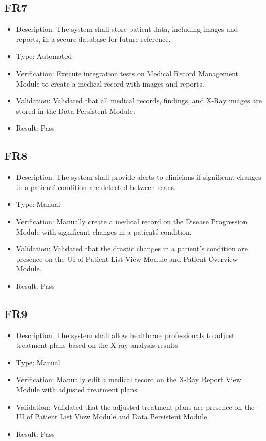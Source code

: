 \documentclass[12pt, titlepage]{article}
\begin{document}
\subsection{FR7}
\begin{itemize}  
  \item Description: The system shall store patient data, including images and reports, in a secure database for future reference.
  \item Type: Automated
  \item Verification: Execute integration tests on Medical Record Management Module to create a medical record with images and reports.
  \item Validation: Validated that all medical records, findings, and X-Ray images are stored in the Data Persistent Module.
  \item Result: Pass
\end{itemize}

\subsection{FR8}
\begin{itemize}  
  \item Description: The system shall provide alerts to clinicians if significant changes in a patient\'s condition are detected between scans.
  \item Type: Manual
  \item Verification: Manually create a medical record on the Disease Progression Module with significant changes in a patient\'s condition.
  \item Validation: Validated that the drastic changes in a patient's condition are presence on the UI of Patient List View Module and Patient Overview Module.
  \item Result: Pass
\end{itemize}

\subsection{FR9}
\begin{itemize}  
  \item Description: The system shall allow healthcare professionals to adjust treatment plans based on the X-ray analysis results
  \item Type: Manual
  \item Verification: Manually edit a medical record on the X-Ray Report View Module with adjusted treatment plans.
  \item Validation: Validated that the adjusted treatment plans are presence on the UI of Patient List View Module and Data Persistent Module.
  \item Result: Pass
\end{itemize}
\end{document}
